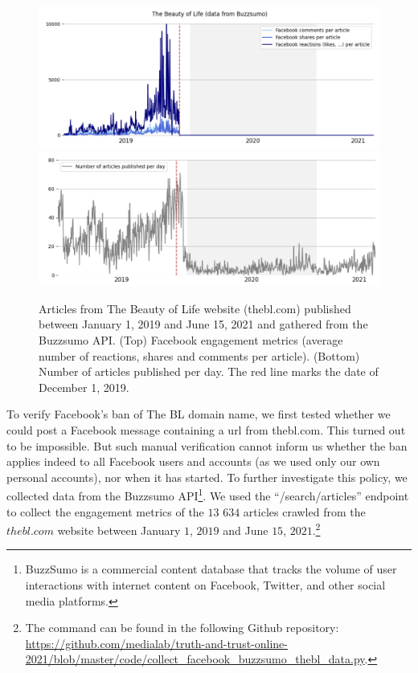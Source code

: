 \documentclass{article}
\begin{document}
\begin{figure}
	\centering
	
		\includegraphics[scale=0.3]{./img/beautyoflife/fb_bl_1.png}
		\includegraphics[scale=0.3]{./img/beautyoflife/fb_bl_2.png} 
	
	\caption{Articles from The Beauty of Life website (thebl.com) published between January 1, 2019 and June 15, 2021 and gathered from the Buzzsumo API. (Top) Facebook engagement metrics (average number of reactions, shares and comments per article). (Bottom) Number of articles published per day. The red line marks the date of December 1, 2019. }
	\label{fb_bl}
\end{figure}

To verify Facebook’s ban of The BL domain name, we first tested whether we could post a Facebook message containing a url from thebl.com. This turned out to be impossible. But such manual verification cannot inform us whether the ban applies indeed to all Facebook users and accounts (as we used only our own personal accounts), nor when it has started. To further investigate this policy, we collected data from the Buzzsumo API\footnote{BuzzSumo is a commercial content database that tracks the volume of user interactions with internet content on Facebook, Twitter, and other social media platforms.}. We used the ``/search/articles'' endpoint to collect the engagement metrics of the $13$ $634$ articles crawled from the $thebl.com$ website between January $1$, $2019$ and June $15$, $2021$.\footnote{The command can be found in the following Github repository: \href{https://github.com/medialab/truth-and-trust-online-2021/blob/master/code/collect\_facebook\_buzzsumo\_thebl\_data.py}{https://github.com/medialab/truth-and-trust-online-2021/blob/master/code/collect\_facebook\_buzzsumo\_thebl\_data.py}.}
\end{document}

